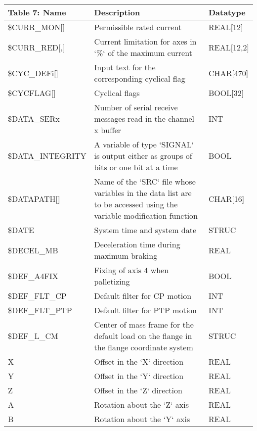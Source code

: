 \begin{appendices}
        \newpage
        \begin{tabular}{|p{}|p{}|p{}|}
        \hline
        \textbf{Table 7: Name} & \textbf{Description} & \textbf{Datatype} \\ \hline
        \$CURR\_MON[] & Permissible rated current & REAL[12] \\ \hline
        \$CURR\_RED[,] & Current limitation for axes in `\%` of the maximum current & REAL[12,2] \\ \hline
        \$CYC\_DEFi[] & Input text for the corresponding cyclical flag & CHAR[470] \\ \hline
        \$CYCFLAG[] & Cyclical flags & BOOL[32] \\ \hline
        \$DATA\_SERx & Number of serial receive messages read in the channel x buffer & INT \\ \hline
        \$DATA\_INTEGRITY & A variable of type `SIGNAL` is output either as groups of bits or one bit at a time & BOOL \\ \hline
        \$DATAPATH[] & Name of the `SRC` file whose variables in the data list are to be accessed using the variable modification function & CHAR[16] \\ \hline
        \$DATE & System time and system date & STRUC \\ \hline
        \$DECEL\_MB & Deceleration time during maximum braking & REAL \\ \hline
        \$DEF\_A4FIX & Fixing of axis 4 when palletizing & BOOL \\ \hline
        \$DEF\_FLT\_CP & Default filter for CP motion & INT \\ \hline
        \$DEF\_FLT\_PTP & Default filter for PTP motion & INT \\ \hline
        \$DEF\_L\_CM & Center of mass frame for the default load on the flange in the flange coordinate system & STRUC \\ \hline
        \quad X & Offset in the `X` direction & REAL \\ \hline
        \quad Y & Offset in the `Y` direction & REAL \\ \hline
        \quad Z & Offset in the `Z` direction & REAL \\ \hline
        \quad A & Rotation about the `Z` axis & REAL \\ \hline
        \quad B & Rotation about the `Y` axis & REAL \\ \hline
        \end{tabular}
        

\end{appendices}
